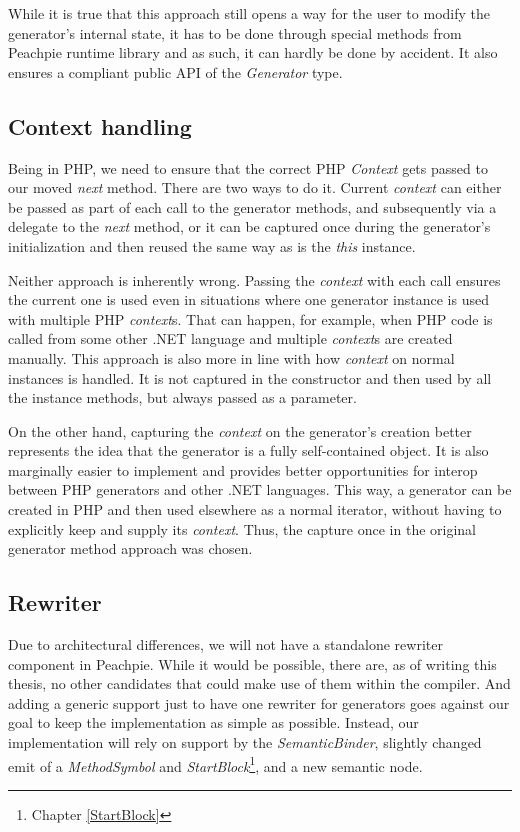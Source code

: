While it is true that this approach still opens a way for the user to modify the generator’s internal state, it has to be done through special methods from Peachpie runtime library and as such, it can hardly be done by accident. It also ensures a compliant public API of the \emph{Generator} type.

\subsection{Context handling}

Being in PHP, we need to ensure that the correct PHP \emph{Context} gets passed to our moved \emph{next} method. There are two ways to do it. Current \emph{context} can either be passed as part of each call to the generator methods, and subsequently via a delegate to the \emph{next} method, or it can be captured once during the generator’s initialization and then reused the same way as is the \emph{this} instance.

Neither approach is inherently wrong. Passing the \emph{context} with each call ensures the current one is used even in situations where one generator instance is used with multiple PHP \emph{context}s. That can happen, for example, when PHP code is called from some other .NET language and multiple \emph{context}s are created manually. This approach is also more in line with how \emph{context} on normal instances is handled. It is not captured in the constructor and then used by all the instance methods, but always passed as a parameter.

On the other hand, capturing the \emph{context} on the generator’s creation better represents the idea that the generator is a fully self-contained object. It is also marginally easier to implement and provides better opportunities for interop between PHP generators and other .NET languages. This way, a generator can be created in PHP and then used elsewhere as a normal iterator, without having to explicitly keep and supply its \emph{context}. Thus, the capture once in the original generator method approach was chosen.

\subsection{Rewriter}

Due to architectural differences, we will not have a standalone rewriter component in Peachpie. While it would be possible, there are, as of writing this thesis, no other candidates that could make use of them within the compiler. And adding a generic support just to have one rewriter for generators goes against our goal to keep the implementation as simple as possible. Instead, our implementation will rely on support by the \emph{SemanticBinder}, slightly changed emit of a \emph{MethodSymbol} and \emph{StartBlock}\footnote{Chapter \ref{StartBlock}}, and a new semantic node. 

